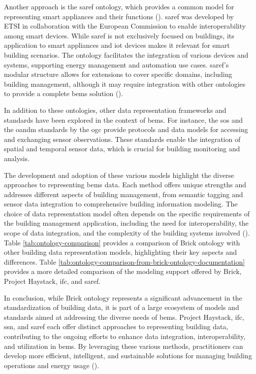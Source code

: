 Another approach is the \gls{saref} ontology, which provides a common model for representing smart appliances and their functions (\cite{Daniele2015}).
\gls{saref} was developed by ETSI in collaboration with the European Commission to enable interoperability among smart devices.
While \gls{saref} is not exclusively focused on buildings, its application to smart appliances and \gls{iot} devices makes it relevant for smart building scenarios.
The ontology facilitates the integration of various devices and systems, supporting energy management and automation use cases.
\gls{saref}'s modular structure allows for extensions to cover specific domains, including building management, although it may require integration with other ontologies to provide a complete \gls{bems} solution (\cite{Daniele2015}).

In addition to these ontologies, other data representation frameworks and standards have been explored in the context of \gls{bems}.
For instance, the \gls{sos} and the \gls{oandm} standards by the \gls{ogc} provide protocols and data models for accessing and exchanging sensor observations.
These standards enable the integration of spatial and temporal sensor data, which is crucial for building monitoring and analysis.

The development and adoption of these various models highlight the diverse approaches to representing \gls{bems} data.
Each method offers unique strengths and addresses different aspects of building management, from semantic tagging and sensor data integration to comprehensive building information modeling.
The choice of data representation model often depends on the specific requirements of the building management application, including the need for interoperability, the scope of data integration, and the complexity of the building systems involved (\cite{Compton2012,Daniele2015}).
Table \ref{tab:ontology-comparison} provides a comparison of Brick ontology with other building data representation models, highlighting their key aspects and differences.
Table \ref{tab:ontology-comparison-from-brick-ontology-documentation} provides a more detailed comparison of the modeling support offered by Brick, Project Haystack, \gls{ifc}, and \gls{saref}.

In conclusion, while Brick ontology represents a significant advancement in the standardization of building data, it is part of a large ecosystem of models and standards aimed at addressing the diverse needs of \gls{bems}.
Project Haystack, \gls{ifc}, \gls{ssn}, and \gls{saref} each offer distinct approaches to representing building data, contributing to the ongoing efforts to enhance data integration, interoperability, and utilization in \gls{bems}.
By leveraging these various methods, practitioners can develop more efficient, intelligent, and sustainable solutions for managing building operations and energy usage (\cite{Balaji2016,Balaji2018}).

